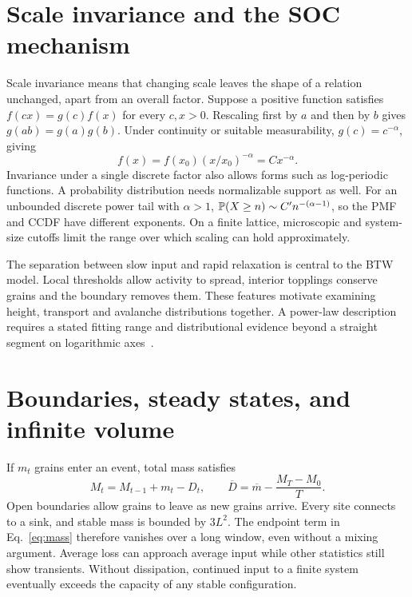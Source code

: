 \section{Scale invariance and the SOC mechanism}\label{sec:scaling}
Scale invariance means that changing scale leaves the shape of a relation unchanged, apart from an overall factor. Suppose a positive function satisfies $f(cx)=g(c)f(x)$ for every $c,x>0$. Rescaling first by $a$ and then by $b$ gives $g(ab)=g(a)g(b)$. Under continuity or suitable measurability, $g(c)=c^{-\alpha}$, giving
\begin{equation}
 f(x)=f(x_0)(x/x_0)^{-\alpha}=Cx^{-\alpha}.
\end{equation}
Invariance under a single discrete factor also allows forms such as log-periodic functions. A probability distribution needs normalizable support as well. For an unbounded discrete power tail with $\alpha>1$, $\mathbb P(X\geq n)\sim C'n^{-(\alpha-1)}$, so the PMF and CCDF have different exponents. On a finite lattice, microscopic and system-size cutoffs limit the range over which scaling can hold approximately.

The separation between slow input and rapid relaxation is central to the BTW model. Local thresholds allow activity to spread, interior topplings conserve grains and the boundary removes them. These features motivate examining height, transport and avalanche distributions together. A power-law description requires a stated fitting range and distributional evidence beyond a straight segment on logarithmic axes~\cite{clauset2009}.

\section{Boundaries, steady states, and infinite volume}\label{sec:boundaries}
If $m_t$ grains enter an event, total mass satisfies
\begin{equation}
 M_t=M_{t-1}+m_t-D_t,\qquad
 \overline D=\overline m-\frac{M_T-M_0}{T}.\label{eq:mass}
\end{equation}
Open boundaries allow grains to leave as new grains arrive. Every site connects to a sink, and stable mass is bounded by $3L^2$. The endpoint term in Eq.~\eqref{eq:mass} therefore vanishes over a long window, even without a mixing argument. Average loss can approach average input while other statistics still show transients. Without dissipation, continued input to a finite system eventually exceeds the capacity of any stable configuration.


